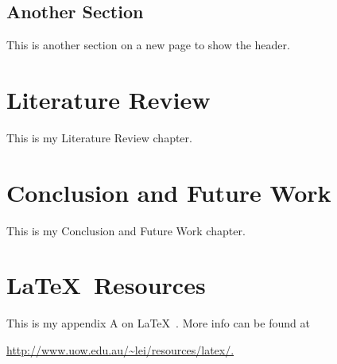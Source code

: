 \section{Another Section}
This is another section on a new page to show the header.
\chapter{Literature Review}
This is my Literature Review chapter.
\chapter{Conclusion and Future Work}
This is my Conclusion and Future Work chapter.
%
%
\appendix
%
\chapter{\LaTeX\ Resources}
This is my appendix A on \LaTeX\ \cite{latex04}. More info can be found at 
\begin{center}
  \url{http://www.uow.edu.au/~lei/resources/latex/.}
\end{center}
%
%
%



